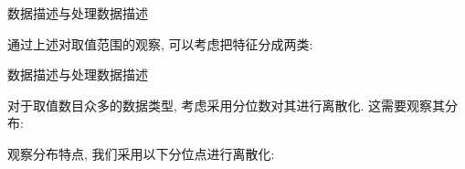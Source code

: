 \begin{frame}{数据描述与处理}{数据描述}

\vspace{-0.2cm}

通过上述对取值范围的观察, 可以考虑把特征分成两类:

\vspace{0.2cm}

\begin{figure}[bth]
\end{figure}

\end{frame}

\begin{frame}{数据描述与处理}{数据描述}

\vspace{-0.2cm}

对于取值数目众多的数据类型, 考虑采用分位数对其进行离散化. 这需要观察其分布: 

\vspace{0.3cm}

\begin{figure}[bth]
\end{figure}

\vspace{0.2cm}
\noindent 观察分布特点, 我们采用以下分位点进行离散化:

\vspace{-0.15cm}
\begin{figure}[bth]
\end{figure}
\end{frame}


